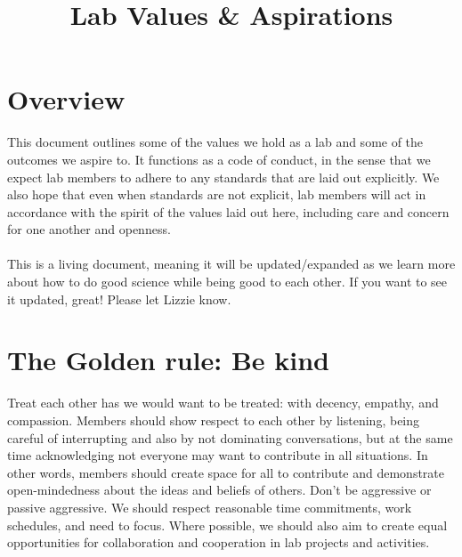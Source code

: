 \documentclass[11pt,a4paper,oneside]{article}
\begin{document}
\title{Lab Values \& Aspirations}
\date{}

\maketitle


\section*{Overview}

This document outlines some of the values we hold as a lab and some of the outcomes we aspire to. It functions as a code of conduct, in the sense that we expect lab members to adhere to any standards that are laid out explicitly. We also hope that even when standards are not explicit, lab members will act in accordance with the spirit of the values laid out here, including care and concern for one another and openness.\\
\\
\noindent
This is a living document, meaning it will be updated/expanded as we learn more about how to do good science while being good to each other. If you want to see it updated, great! Please let Lizzie know.

\section{The Golden rule: Be kind}

Treat each other has we would want to be treated: with decency, empathy, and compassion. Members should show respect to each other by listening, being careful of interrupting and also by not dominating conversations, but at the same time acknowledging not everyone may want to contribute in all situations. In other words, members should create space for all to contribute and demonstrate open-mindedness about the ideas and beliefs of others. Don't be aggressive or passive aggressive. We should respect reasonable time commitments, work schedules, and need to focus. Where possible, we should also aim to create equal opportunities for collaboration and cooperation in lab projects and activities. 

\end{document}
